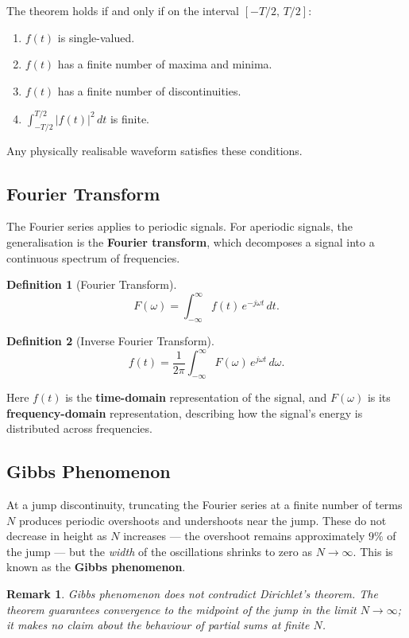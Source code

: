 \documentclass{article}
\newtheorem{definition}{Definition}
\newtheorem{remark}{Remark}
\begin{document}
The theorem holds if and only if on the interval $[-T/2,\, T/2]$:
\begin{enumerate}
    \item $f(t)$ is single-valued.
    \item $f(t)$ has a finite number of maxima and minima.
    \item $f(t)$ has a finite number of discontinuities.
    \item $\displaystyle\int_{-T/2}^{T/2}|f(t)|^2\,dt$ is finite.
\end{enumerate}
Any physically realisable waveform satisfies these conditions.

\subsection{Fourier Transform}

The Fourier series applies to periodic signals. For aperiodic signals, the generalisation is the \textbf{Fourier transform}, which decomposes a signal into a continuous spectrum of frequencies.

\begin{definition}[Fourier Transform]
    \[F(\omega) = \int_{-\infty}^{\infty} f(t)\,e^{-j\omega t}\,dt.\]
\end{definition}

\begin{definition}[Inverse Fourier Transform]
    \[f(t) = \frac{1}{2\pi}\int_{-\infty}^{\infty} F(\omega)\,e^{j\omega t}\,d\omega.\]
\end{definition}

Here $f(t)$ is the \textbf{time-domain} representation of the signal, and $F(\omega)$ is its \textbf{frequency-domain} representation, describing how the signal's energy is distributed across frequencies.

\subsection{Gibbs Phenomenon}

At a jump discontinuity, truncating the Fourier series at a finite number of terms $N$ produces periodic overshoots and undershoots near the jump. These do not decrease in height as $N$ increases — the overshoot remains approximately $9\%$ of the jump — but the \emph{width} of the oscillations shrinks to zero as $N \to \infty$. This is known as the \textbf{Gibbs phenomenon}.

\begin{remark}
    Gibbs phenomenon does not contradict Dirichlet's theorem. The theorem guarantees convergence to the midpoint of the jump in the limit $N \to \infty$; it makes no claim about the behaviour of partial sums at finite $N$.
\end{remark}
\end{document}
